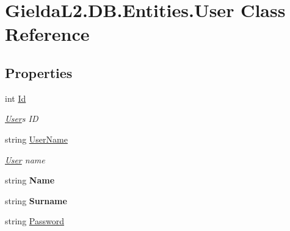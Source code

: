 \hypertarget{class_gielda_l2_1_1_d_b_1_1_entities_1_1_user}{}\section{Gielda\+L2.\+D\+B.\+Entities.\+User Class Reference}
\label{class_gielda_l2_1_1_d_b_1_1_entities_1_1_user}
\subsection*{Properties}
\begin{DoxyCompactItemize}
\item 
int \mbox{\hyperlink{class_gielda_l2_1_1_d_b_1_1_entities_1_1_user_a4746c5c16f823e16bf2ec8b86d51d017}{Id}}
\begin{DoxyCompactList}\small\item\em \mbox{\hyperlink{class_gielda_l2_1_1_d_b_1_1_entities_1_1_user}{User}}\textquotesingle{}s ID \end{DoxyCompactList}\item 
string \mbox{\hyperlink{class_gielda_l2_1_1_d_b_1_1_entities_1_1_user_adecd1c4376681df4136502e15d5a921c}{User\+Name}}
\begin{DoxyCompactList}\small\item\em \mbox{\hyperlink{class_gielda_l2_1_1_d_b_1_1_entities_1_1_user}{User}} name \end{DoxyCompactList}\item 
\mbox{\label{class_gielda_l2_1_1_d_b_1_1_entities_1_1_user_a860f13730e814d6b4e2a703a98ee2d95}} 
string {\bfseries Name}
\item 
\mbox{\label{class_gielda_l2_1_1_d_b_1_1_entities_1_1_user_a0245f1d935b792db4f789a505c4f209a}} 
string {\bfseries Surname}
\item 
string \mbox{\hyperlink{class_gielda_l2_1_1_d_b_1_1_entities_1_1_user_ab546ab0e6a45d75aea8117dfbae77944}{Password}}

\end{DoxyCompactItemize}

